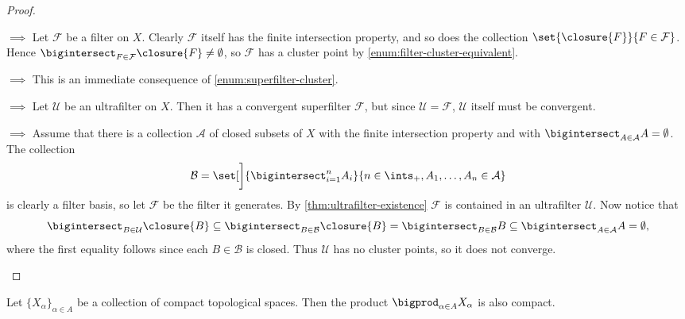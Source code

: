 \documentclass[article, a4paper, 11pt, oneside]{memoir}
\numberwithin{equation}{chapter}
\newcommand{\calU}{\mathcal{U}}
\newcommand{\calB}{\mathcal{B}}
\newcommand{\calF}{\mathcal{F}}
\newcommand{\calA}{\mathcal{A}}
\theoremstyle{nonumberplain}
\begin{document}
\begin{proof}
\begin{proofsec}
    \item[\subcref{enum:space-compact} $\implies$ \subcref{enum:every-filter-cluster}]
    Let $\calF$ be a filter on $X$. Clearly $\calF$ itself has the finite intersection property, and so does the collection $\set{ \closure{F}}{F \in \calF}$. Hence $\bigintersect_{F \in \calF} \closure{F} \neq \emptyset$, so $\calF$ has a cluster point by \cref{enum:filter-cluster-equivalent}.

    \item[\subcref{enum:every-filter-cluster} $\implies$ \subcref{enum:every-filter-convergent-superfilter}]
    This is an immediate consequence of \cref{enum:superfilter-cluster}.

    \item[\subcref{enum:every-filter-convergent-superfilter} $\implies$ \subcref{enum:every-ultrafilter-converges}]
    Let $\calU$ be an ultrafilter on $X$. Then it has a convergent superfilter $\calF$, but since $\calU = \calF$, $\calU$ itself must be convergent.

    \item[\subcref{enum:every-ultrafilter-converges} $\implies$ \subcref{enum:space-compact}]
    Assume that there is a collection $\calA$ of closed subsets of $X$ with the finite intersection property and with $\bigintersect_{A \in \calA} A = \emptyset$. The collection
    \begin{equation*}
        \calB
            = \set[\bigg]{ \bigintersect_{i=1}^n A_i }{ n \in \ints_+, A_1, \ldots, A_n \in \calA }
    \end{equation*}
    is clearly a filter basis, so let $\calF$ be the filter it generates. By \cref{thm:ultrafilter-existence} $\calF$ is contained in an ultrafilter $\calU$. Now notice that
    \begin{equation*}
        \bigintersect_{B \in \calU} \closure{B}
            \subseteq \bigintersect_{B \in \calB} \closure{B}
            = \bigintersect_{B \in \calB} B
            \subseteq \bigintersect_{A \in \calA} A
            = \emptyset,
    \end{equation*}
    where the first equality follows since each $B \in \calB$ is closed. Thus $\calU$ has no cluster points, so it does not converge.
\end{proofsec}
\end{proof}


\begin{theorem}
    Let $\{X_\alpha\}_{\alpha \in A}$ be a collection of compact topological spaces. Then the product $\bigprod_{\alpha \in A} X_\alpha$ is also compact.
\end{theorem}
\end{document}
